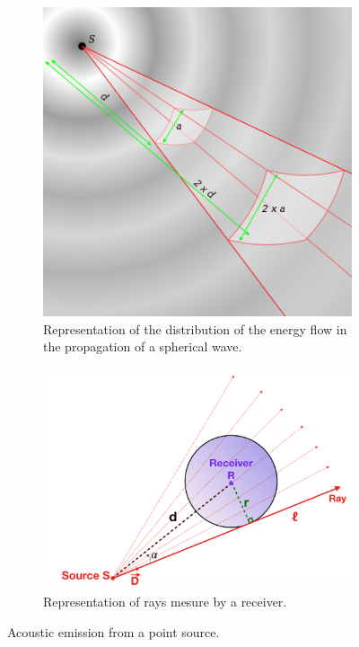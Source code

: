 \documentclass[AMA,STIX1COL]{WileyNJD-v2}
\begin{document}
\begin{figure}
	\centering
	\begin{subfigure}{0.35\textwidth}
		\includegraphics[width=\textwidth]{flux}
		\caption{Representation of the distribution of the energy flow in the propagation of a spherical wave.}
		\label{flux}
	\end{subfigure}
	\begin{subfigure}{0.6\textwidth}
		\includegraphics[width=\textwidth]{rays}
		\caption{Representation of rays mesure by a receiver.}
		\label{rays}
	\end{subfigure}	
	\caption{Acoustic emission from a point source.}
\end{figure}
\end{document}
